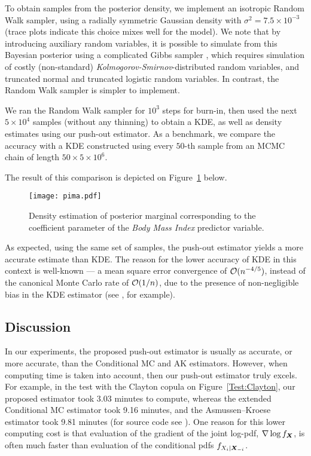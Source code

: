 To obtain samples from the posterior density, we implement an isotropic Random Walk sampler, using a radially symmetric Gaussian density with $\sigma^2 = 7.5\times 10^{-3}$ (trace plots indicate this choice mixes well for the model). We note that by introducing 
auxiliary random variables, it is possible to simulate from this Bayesian posterior  using a complicated Gibbs sampler  \cite[Equation 8]{holmes2006bayesian}, which requires simulation of costly (non-standard) \emph{Kolmogorov-Smirnov}-distributed random variables, and truncated normal and truncated logistic random variables.  In contrast, the Random Walk sampler is simpler to implement. 



We ran the Random Walk sampler for $10^3$ steps for burn-in, then used the next $5 \times 10^4$ samples (without any thinning) to obtain a KDE, as well as density estimates using our push-out estimator.  As a benchmark, we  compare the accuracy with a KDE constructed using every $50$-th  sample from an MCMC chain of length $50\times 5 \times 10^6$. 




The result of this comparison is depicted on Figure~\ref{fig:marginal} below.
\begin{figure}[H]
    \centering 
    \texttt{[image: pima.pdf]}
    \caption{Density estimation of posterior marginal corresponding to the coefficient parameter of the {\em Body Mass Index} predictor variable.}
    \label{fig:marginal}
\end{figure}



As expected, using the same set of samples, the push-out estimator yields a  more accurate estimate than KDE. The reason for the lower accuracy of KDE  in this context is well-known --- a mean square error convergence of
$\mathcal{O}(n^{-4/5})$, instead of the canonical Monte Carlo rate of $\mathcal{O}(1/n)$,
due to the presence of non-negligible bias in the KDE estimator (see \cite{botev2010kernel}, for example).



\subsection{Discussion} \label{sec:Discussion}
In our experiments, the proposed push-out estimator is usually as accurate, or more accurate, than the Conditional MC and AK estimators. However, when computing time is taken into account, then our push-out estimator truly excels.  For example, in the test with the Clayton copula on Figure~\ref{Test:Clayton}, our proposed estimator took 3.03 minutes to compute, whereas the extended Conditional MC estimator took 9.16 minutes, and the Asmussen--Kroese estimator took 9.81 minutes
(for source code see \cite{PushoutCode}). One reason for this lower computing cost is that evaluation of the gradient of the joint log-pdf, $\nabla \log f_{\boldsymbol{X}}$, is often much faster than evaluation of the conditional pdfs $f_{X_i | \boldsymbol{X}_{-i}}$.  

